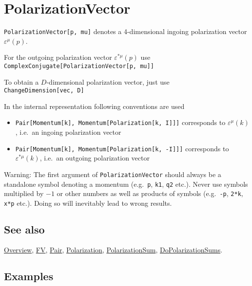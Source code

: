 \documentclass[../FeynCalcManual.tex]{subfiles}
\begin{document}
\hypertarget{polarizationvector}{%
\section{PolarizationVector}\label{polarizationvector}}

\texttt{PolarizationVector[\allowbreak{}p,\ \allowbreak{}mu]} denotes a
4-dimensional ingoing polarization vector \(\varepsilon^\mu(p)\).

For the outgoing polarization vector \(\varepsilon^{\ast \mu}(p)\) use
\texttt{ComplexConjugate[\allowbreak{}PolarizationVector[\allowbreak{}p,\ \allowbreak{}mu]]}

To obtain a \(D\)-dimensional polarization vector, just use
\texttt{ChangeDimension[\allowbreak{}vec,\ \allowbreak{}D]}

In the internal representation following conventions are used

\begin{itemize}
\item
  \texttt{Pair[\allowbreak{}Momentum[\allowbreak{}k],\ \allowbreak{}Momentum[\allowbreak{}Polarization[\allowbreak{}k,\ \allowbreak{}I]]]}
  corresponds to \(\varepsilon^{\mu}(k)\), i.e.~an ingoing polarization
  vector
\item
  \texttt{Pair[\allowbreak{}Momentum[\allowbreak{}k],\ \allowbreak{}Momentum[\allowbreak{}Polarization[\allowbreak{}k,\ \allowbreak{}-I]]]}
  corresponds to \(\varepsilon^{\ast \mu}(k)\), i.e.~an outgoing
  polarization vector
\end{itemize}

Warning: The first argument of \texttt{PolarizationVector} should always
be a standalone symbol denoting a momentum (e.g.~\texttt{p},
\texttt{k1}, \texttt{q2} etc.). Never use symbols multiplied by \(-1\)
or other numbers as well as products of symbols (e.g.~\texttt{-p},
\texttt{2*k}, \texttt{x*p} etc.). Doing so will inevitably lead to wrong
results.

\subsection{See also}

\hyperlink{toc}{Overview}, \hyperlink{fv}{FV}, \hyperlink{pair}{Pair},
\hyperlink{polarization}{Polarization},
\hyperlink{polarizationsum}{PolarizationSum},
\hyperlink{dopolarizationsums}{DoPolarizationSums}.

\subsection{Examples}
\end{document}
